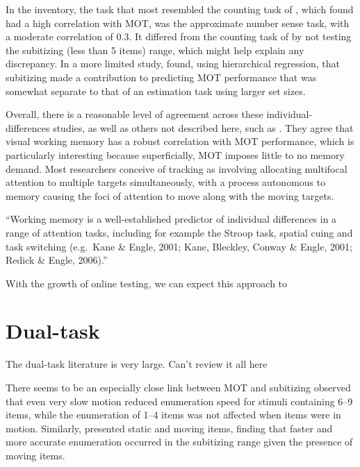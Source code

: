 \documentclass[]{book}
\begin{document}
In the \citet{trevinoBridgingCognitiveNeuropsychological} inventory, the task that most resembled the counting task of \citet{huangMeasuringInterrelationsMultiple2012}, which \citet{huangMeasuringInterrelationsMultiple2012} found had a high correlation with MOT, was the approximate number sense task, with a moderate correlation of 0.3. It differed from the counting task of \citet{huangMeasuringInterrelationsMultiple2012} by not testing the subitizing (less than 5 items) range, which might help explain any discrepancy. In a more limited study, \citet{eayrsEstablishingIndividualDifferences2018} found, using hierarchical regression, that subitizing made a contribution to predicting MOT performance that was somewhat separate to that of an estimation task using larger set sizes.

Overall, there is a reasonable level of agreement across these individual-differences studies, as well as others not described here, such as \citet{trickSpatialVisuospatialWorking2012}. They agree that visual working memory has a robust correlation with MOT performance, which is particularly interesting because superficially, MOT imposes little to no memory demand. Most researchers conceive of tracking as involving allocating multifocal attention to multiple targets simultaneously, with a process autonomous to memory causing the foci of attention to move along with the moving targets.

``Working memory is a well-established predictor of individual differences in a range of attention tasks, including for example the Stroop task, spatial cuing and task switching (e.g.~Kane \& Engle, 2001; Kane, Bleckley, Conway \& Engle, 2001; Redick \& Engle, 2006).''

With the growth of online testing, we can expect this approach to

\hypertarget{dual-task}{%
\section{Dual-task}\label{dual-task}}

The dual-task literature is very large. Can't review it all here

There seems to be an especially close link between MOT and subitizing
\citet{trickAgeDifferencesEnumerating2003} observed that even very slow motion reduced
enumeration speed for stimuli containing 6--9 items, while
the enumeration of 1--4 items was not affected when items
were in motion. Similarly, \citet{alstonSubitizationAttentionalEngagement2004}
presented static and moving items, finding that faster and
more accurate enumeration occurred in the subitizing range
given the presence of moving items.
\end{document}
